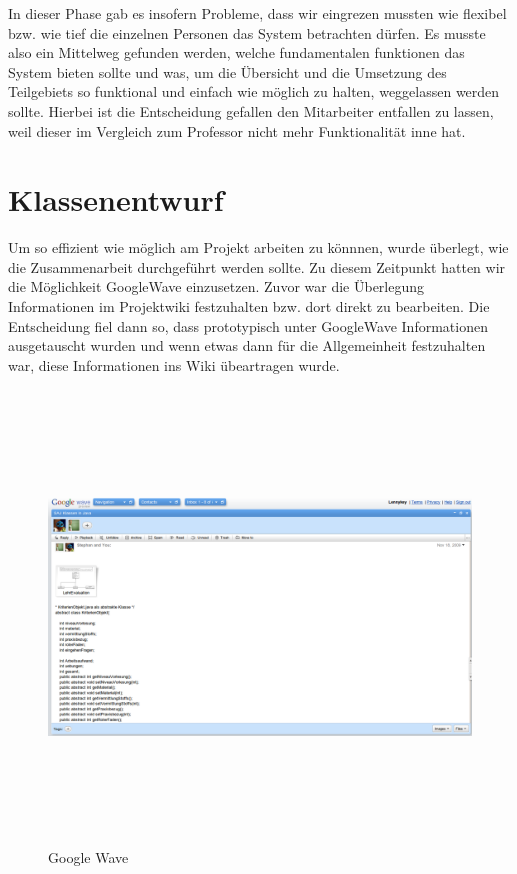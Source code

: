 \documentclass[titlepage, 12pt,a4paper]{scrartcl}
\begin{document}
In dieser Phase gab es insofern Probleme, dass wir eingrezen mussten wie
flexibel bzw. wie tief die einzelnen Personen das System betrachten dürfen. Es
musste also ein Mittelweg gefunden werden, welche fundamentalen funktionen das
System bieten sollte und was, um die Übersicht und die Umsetzung des
Teilgebiets so funktional und einfach wie möglich zu halten, weggelassen werden
sollte. Hierbei ist die Entscheidung gefallen den Mitarbeiter entfallen zu
lassen, weil dieser im Vergleich zum Professor nicht mehr Funktionalität inne
hat. 
\section{Klassenentwurf}
Um so effizient wie möglich am Projekt arbeiten zu könnnen, wurde überlegt, wie
die Zusammenarbeit durchgeführt werden sollte. Zu diesem Zeitpunkt hatten
wir die Möglichkeit GoogleWave einzusetzen. Zuvor war die Überlegung
Informationen im Projektwiki festzuhalten bzw. dort direkt zu bearbeiten. Die
Entscheidung fiel dann so, dass prototypisch unter GoogleWave Informationen
ausgetauscht wurden und wenn etwas dann für die Allgemeinheit festzuhalten war,
diese Informationen ins Wiki übeartragen wurde. 

\begin{figure}[h]
\begin{center}
\includegraphics[width=15cm, height=12cm]{bilder/googleWave.png}
\caption{Google Wave}
\label{googleWave}
\end{center}
\end{figure}
\end{document}
